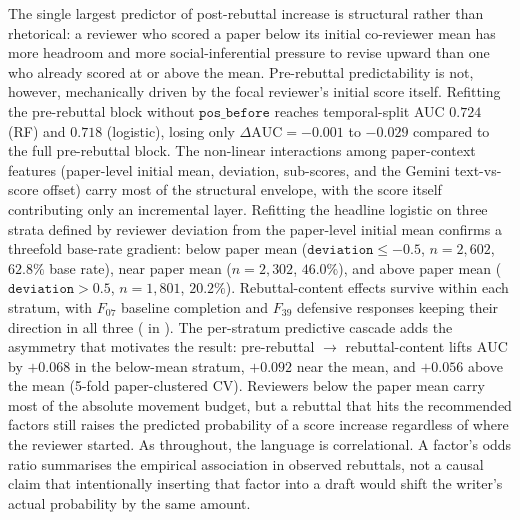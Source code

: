 \documentclass{article}
\newcommand{\code}[1]{\texttt{#1}}
\newcommand{\auc}{\text{AUC}}
\begin{document}
The single largest predictor of post-rebuttal increase is structural rather than rhetorical: a reviewer who scored a paper below its initial co-reviewer mean has more headroom and more social-inferential pressure to revise upward than one who already scored at or above the mean. Pre-rebuttal predictability is not, however, mechanically driven by the focal reviewer's initial score itself. Refitting the pre-rebuttal block without $\code{pos\_before}$ reaches temporal-split AUC $0.724$ (RF) and $0.718$ (logistic), losing only $\Delta\auc = -0.001$ to $-0.029$ compared to the full pre-rebuttal block. The non-linear interactions among paper-context features (paper-level initial mean, deviation, sub-scores, and the Gemini text-vs-score offset) carry most of the structural envelope, with the score itself contributing only an incremental layer. Refitting the headline logistic on three strata defined by reviewer deviation from the paper-level initial mean confirms a threefold base-rate gradient: below paper mean ($\code{deviation} \le -0.5$, $n = 2{,}602$, $62.8\%$ base rate), near paper mean ($n = 2{,}302$, $46.0\%$), and above paper mean ($\code{deviation} > 0.5$, $n = 1{,}801$, $20.2\%$). Rebuttal-content effects survive within each stratum, with $F_{07}$ baseline completion and $F_{39}$ defensive responses keeping their direction in all three ( in ). The per-stratum predictive cascade adds the asymmetry that motivates the result: pre-rebuttal $\to$ rebuttal-content lifts $\auc$ by $+0.068$ in the below-mean stratum, $+0.092$ near the mean, and $+0.056$ above the mean (5-fold paper-clustered CV). Reviewers below the paper mean carry most of the absolute movement budget, but a rebuttal that hits the recommended factors still raises the predicted probability of a score increase regardless of where the reviewer started. As throughout, the language is correlational. A factor's odds ratio summarises the empirical association in observed rebuttals, not a causal claim that intentionally inserting that factor into a draft would shift the writer's actual probability by the same amount.
\end{document}
